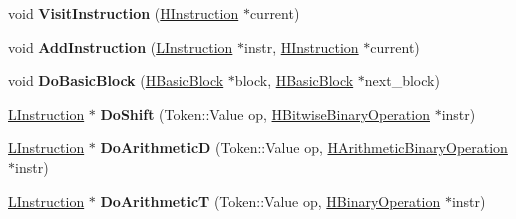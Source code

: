\begin{DoxyCompactItemize}
\item 
void {\bfseries Visit\+Instruction} (\hyperlink{classv8_1_1internal_1_1_h_instruction}{H\+Instruction} $\ast$current)\hypertarget{classv8_1_1internal_1_1_l_chunk_builder_a4da411e2e5777292cd23626bb87e5dc4}{}\label{classv8_1_1internal_1_1_l_chunk_builder_a4da411e2e5777292cd23626bb87e5dc4}

\item 
void {\bfseries Add\+Instruction} (\hyperlink{classv8_1_1internal_1_1_l_instruction}{L\+Instruction} $\ast$instr, \hyperlink{classv8_1_1internal_1_1_h_instruction}{H\+Instruction} $\ast$current)\hypertarget{classv8_1_1internal_1_1_l_chunk_builder_a834f4cd3c745234bc4ee8470490cfc89}{}\label{classv8_1_1internal_1_1_l_chunk_builder_a834f4cd3c745234bc4ee8470490cfc89}

\item 
void {\bfseries Do\+Basic\+Block} (\hyperlink{classv8_1_1internal_1_1_h_basic_block}{H\+Basic\+Block} $\ast$block, \hyperlink{classv8_1_1internal_1_1_h_basic_block}{H\+Basic\+Block} $\ast$next\+\_\+block)\hypertarget{classv8_1_1internal_1_1_l_chunk_builder_a0ba0ae4aeac5d0656366705f205680ed}{}\label{classv8_1_1internal_1_1_l_chunk_builder_a0ba0ae4aeac5d0656366705f205680ed}

\item 
\hyperlink{classv8_1_1internal_1_1_l_instruction}{L\+Instruction} $\ast$ {\bfseries Do\+Shift} (Token\+::\+Value op, \hyperlink{classv8_1_1internal_1_1_h_bitwise_binary_operation}{H\+Bitwise\+Binary\+Operation} $\ast$instr)\hypertarget{classv8_1_1internal_1_1_l_chunk_builder_a7fb98733b4fc4b83c5f63039c8bc249f}{}\label{classv8_1_1internal_1_1_l_chunk_builder_a7fb98733b4fc4b83c5f63039c8bc249f}

\item 
\hyperlink{classv8_1_1internal_1_1_l_instruction}{L\+Instruction} $\ast$ {\bfseries Do\+ArithmeticD} (Token\+::\+Value op, \hyperlink{classv8_1_1internal_1_1_h_arithmetic_binary_operation}{H\+Arithmetic\+Binary\+Operation} $\ast$instr)\hypertarget{classv8_1_1internal_1_1_l_chunk_builder_a9b447e818699e4928b4f769ae6b7ecbd}{}\label{classv8_1_1internal_1_1_l_chunk_builder_a9b447e818699e4928b4f769ae6b7ecbd}

\item 
\hyperlink{classv8_1_1internal_1_1_l_instruction}{L\+Instruction} $\ast$ {\bfseries Do\+ArithmeticT} (Token\+::\+Value op, \hyperlink{classv8_1_1internal_1_1_h_binary_operation}{H\+Binary\+Operation} $\ast$instr)\hypertarget{classv8_1_1internal_1_1_l_chunk_builder_aba09d1f1c27b568c058b1d54bb250d12}{}\label{classv8_1_1internal_1_1_l_chunk_builder_aba09d1f1c27b568c058b1d54bb250d12}


\end{DoxyCompactItemize}

